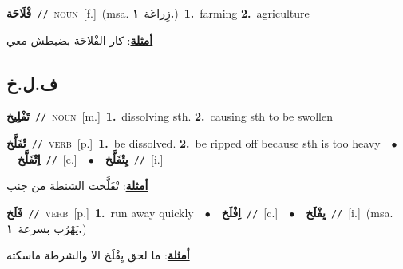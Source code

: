 \documentclass[10pt,a4paper,twoside]{article} %
\begin{document}
\begin{multicols}{2}
{\setlength\topsep{0pt}\textbf{\foreignlanguage{arabic}{فْلَاحَة}}\ {\color{gray}\texttt{//}\color{black}}\ \textsc{noun}\ [f.]\ \color{gray}(msa. \foreignlanguage{arabic}{زِراعَة}~\foreignlanguage{arabic}{\textbf{١.}})\color{black}\ \textbf{1.}~farming  \textbf{2.}~agriculture\  \begin{flushright}\color{gray}\foreignlanguage{arabic}{\textbf{\underline{\foreignlanguage{arabic}{أمثلة}}}: كار الفْلاحَة بضبطش معي}\end{flushright}\color{black}} \vspace{2mm}

\vspace{-3mm}
\subsection*{\color{blue}\foreignlanguage{arabic}{ف.ل.خ}\color{blue}{}} 

{\setlength\topsep{0pt}\textbf{\foreignlanguage{arabic}{تَفْلِيخ}}\ {\color{gray}\texttt{//}\color{black}}\ \textsc{noun}\ [m.]\ \textbf{1.}~dissolving sth.  \textbf{2.}~causing sth to be swollen\ } \vspace{2mm}

{\setlength\topsep{0pt}\textbf{\foreignlanguage{arabic}{تْفَلَّخ}}\ {\color{gray}\texttt{//}\color{black}}\ \textsc{verb}\ [p.]\ \textbf{1.}~be dissolved.  \textbf{2.}~be ripped off because sth is too heavy\ \ $\bullet$\ \ \setlength\topsep{0pt}\textbf{\foreignlanguage{arabic}{اِتْفَلَّخ}}\ {\color{gray}\texttt{//}\color{black}}\ [c.]\ \ $\bullet$\ \ \setlength\topsep{0pt}\textbf{\foreignlanguage{arabic}{يِتْفَلَّخ}}\ {\color{gray}\texttt{//}\color{black}}\ [i.]\  \begin{flushright}\color{gray}\foreignlanguage{arabic}{\textbf{\underline{\foreignlanguage{arabic}{أمثلة}}}: تْفَلَّخت الشنطة من جنب}\end{flushright}\color{black}} \vspace{2mm}

{\setlength\topsep{0pt}\textbf{\foreignlanguage{arabic}{فَلَخ}}\ {\color{gray}\texttt{//}\color{black}}\ \textsc{verb}\ [p.]\ \textbf{1.}~run away quickly\ \ $\bullet$\ \ \setlength\topsep{0pt}\textbf{\foreignlanguage{arabic}{اِفْلَخ}}\ {\color{gray}\texttt{//}\color{black}}\ [c.]\ \ $\bullet$\ \ \setlength\topsep{0pt}\textbf{\foreignlanguage{arabic}{يِفْلَخ}}\ {\color{gray}\texttt{//}\color{black}}\ [i.]\ \color{gray}(msa. \foreignlanguage{arabic}{يَهْرُب بسرعة}~\foreignlanguage{arabic}{\textbf{١.}})\color{black}\  \begin{flushright}\color{gray}\foreignlanguage{arabic}{\textbf{\underline{\foreignlanguage{arabic}{أمثلة}}}: ما لحق يِفْلَخ الا والشرطة ماسكته}\end{flushright}\color{black}} \vspace{2mm}


\end{multicols}
\end{document}
